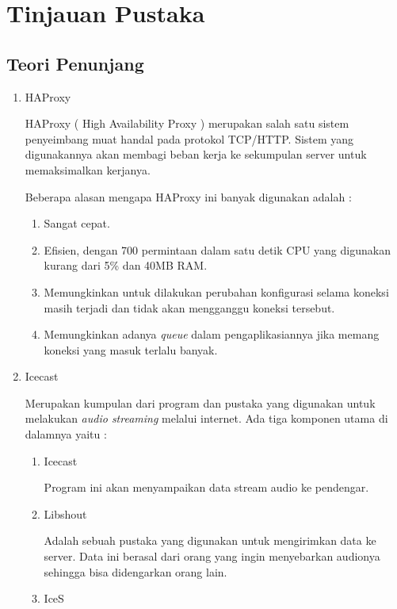 \chapter{Tinjauan Pustaka}
\section{Teori Penunjang}
\begin{enumerate}
    \item HAProxy
    
    HAProxy ( High Availability Proxy ) merupakan salah satu sistem penyeimbang muat handal pada protokol TCP/HTTP. Sistem yang digunakannya akan membagi beban kerja ke sekumpulan server untuk memaksimalkan kerjanya.
    
    Beberapa alasan mengapa HAProxy ini banyak digunakan adalah :
    \begin{enumerate}
        \item Sangat cepat.
        \item Efisien, dengan 700 permintaan dalam satu detik CPU yang digunakan kurang dari 5\% dan 40MB RAM.
        \item Memungkinkan untuk dilakukan perubahan konfigurasi selama koneksi masih terjadi dan tidak akan mengganggu koneksi tersebut.
        \item Memungkinkan adanya \textit{queue} dalam pengaplikasiannya jika memang koneksi yang masuk terlalu banyak.
    \end{enumerate}
    
    
    \item Icecast
    
    Merupakan kumpulan dari program dan pustaka yang digunakan untuk melakukan \textit{audio streaming} melalui internet. Ada tiga komponen utama di dalamnya yaitu :
    
    \begin{enumerate}
        \item Icecast
        
        Program ini akan menyampaikan data stream audio ke pendengar.
        
        \item Libshout
        
        Adalah sebuah pustaka yang digunakan untuk mengirimkan data ke server. Data ini berasal dari orang yang ingin menyebarkan audionya sehingga bisa didengarkan orang lain.
        
        \item IceS
        

\end{enumerate}
\end{enumerate}

